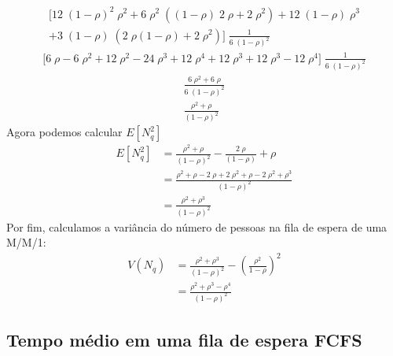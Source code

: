 \documentclass[a4paper]{article}
\newcommand{\E}[1]{E\!\left[#1\right]}
\begin{document}
\begin{align*}
    \biggl[
        12 \; (1 - \rho)^2 \; \rho^2
        + 6 \; \rho^2 \; ((1 - \rho) \; 2 \; \rho
        + 2 \; \rho^2) + 12 \; (1 - \rho) \; \rho^3 \\
        + 3 \; (1 - \rho) \; (2 \; \rho (1 - \rho)
        + 2 \; \rho^2)
    \biggr] \; \frac{1}{6 \; (1 - \rho)^2}
\end{align*} \begin{align*}
    \biggl[
        6 \; \rho - 6 \; \rho^2 + 12 \; \rho^2
        - 24 \; \rho^3 + 12 \; \rho^4 + 12 \; \rho^3
        + 12 \; \rho^3 - 12 \; \rho^4
    \biggr] \; \frac{1}{6 \; (1 - \rho)^2}
\end{align*} \begin{align*}
    \frac{6 \; \rho^2 + 6 \; \rho}{6 \; (1 - \rho)^2} \\
    \frac{\rho^2 + \rho}{(1 - \rho)^2}
\end{align*}
Agora podemos calcular \(E[N_q^{2}]\)
\begin{align*}
    \E{N_q^2} &= \frac{\rho^2 + \rho}{(1 - \rho)^2}
        - \frac{2 \; \rho}{(1 - \rho)} + \rho \\
    &= \frac{\rho^2 + \rho - 2 \;\rho + 2 \; \rho^2
        + \rho - 2 \; \rho^2 + \rho^3}{(1 - \rho)^2} \\
    &= \frac{\rho^2 + \rho^3}{(1 - \rho)^2}
\end{align*}
Por fim, calculamos a variância do número de pessoas
na fila de espera de uma M/M/1:
\begin{align*}
    V(N_q) &= \frac{\rho^2 + \rho^3}{(1 - \rho)^2}
        - (\frac{\rho^2}{1 - \rho})^2 \\
    &=\frac{\rho^2 + \rho^3 - \rho^4}{(1-\rho)^2}
\end{align*}

\subsection{Tempo médio em uma fila de espera FCFS}
\end{document}
